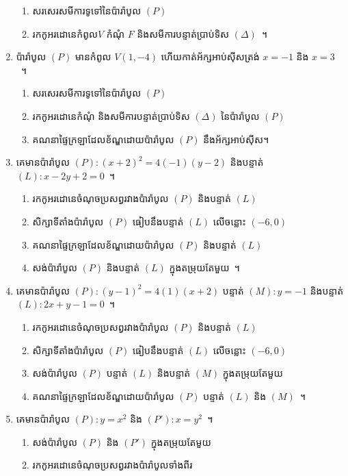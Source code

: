 \begin{enumerate}
	\begin{enumerate}
		\item សរសេរសមីការទូទៅនៃប៉ារ៉ាបូល $ (P) $
		\item រកកូអរដោនេកំពូល​ $ V $ កំណុំ $ F $ និងសមីការបន្ទាត់ប្រាប់ទិស $ (\Delta) $~។
	\end{enumerate}
	\item ប៉ារ៉ាបូល $ (P) $ មានកំពូល $ V(1,-4) $ ហើយកាត់អ័ក្សអាប់ស៊ីសត្រង់ $ x=-1 $ និង $ x=3 $~។
	\begin{enumerate}
		\item សរសេរសមីការទូទៅនៃប៉ារ៉ាបូល $ (P) $
		\item រកកូអរដោនេកំណុំ និងសមីការបន្ទាត់ប្រាប់ទិស $ (\Delta) $ នៃប៉ារ៉ាបូល $ (P) $
		\item គណនាផ្ទៃក្រឡាដែលខ័ណ្ឌដោយប៉ារ៉ាបូល $ (P) $ នឹងអ័ក្សអាប់ស៊ីស។
	\end{enumerate}
	\item គេមានប៉ារ៉ាបូល $ (P): (x+2)^2=4(-1)(y-2) $ និងបន្ទាត់ $ (L):x-2y+2=0  $~។
	\begin{enumerate}
		\item រកកូអរដោនេចំណុចប្រសព្វរវាងប៉ារ៉ាបូល $ (P) $ និងបន្ទាត់ $ (L) $
		\item សិក្សាទីតាំងប៉ារ៉ាបូល $ (P) $ ធៀបនឹងបន្ទាត់ $ (L) $ លើចន្លោះ $ (-6,0) $
		\item គណនាផ្ទៃក្រឡាដែលខ័ណ្ឌដោយប៉ារ៉ាបូល $ (P) $ និងបន្ទាត់ $ (L) $
		\item សង់ប៉ារ៉ាបូល $ (P) $ និងបន្ទាត់ $ (L) $ ក្នុងតម្រុយតែមួយ~។
	\end{enumerate}
	\item គេមានប៉ារ៉ាបូល $ (P): (y-1)^2=4(1)(x+2) $ បន្ទាត់ $ (M):y=-1 $ និងបន្ទាត់ $ (L):2x+y-1=0  $~។
	\begin{enumerate}
		\item រកកូអរដោនេចំណុចប្រសព្វរវាងប៉ារ៉ាបូល $ (P) $ និងបន្ទាត់ $ (L) $
		\item សិក្សាទីតាំងប៉ារ៉ាបូល $ (P) $ ធៀបនឹងបន្ទាត់ $ (L) $ លើចន្លោះ $ (-6,0) $
		\item សង់ប៉ារ៉ាបូល $ (P) $ បន្ទាត់ $ (L) $ និងបន្ទាត់ $ (M) $ ក្នុងតម្រុយតែមួយ
		\item គណនាផ្ទៃក្រឡាដែលខ័ណ្ឌដោយប៉ារ៉ាបូល $ (P) $ បន្ទាត់ $ (L) $ និង $ (M) $~។
	\end{enumerate}
	\item គេមានប៉ារ៉ាបូល $ (P):y=x^2 $ និង $ (P'):x=y^2 $~។
	\begin{enumerate}
		\item សង់ប៉ារ៉ាបូល $ (P) $ និង $ (P') $ ក្នុងតម្រុយតែមួយ
		\item រកកូអរដោនេចំណុចប្រសព្វរវាងប៉ារ៉ាបូលទាំងពីរ

\end{enumerate}
\end{enumerate}
